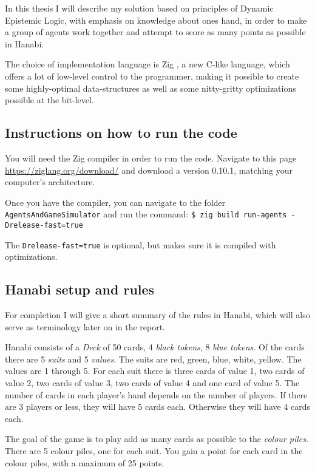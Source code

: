 In this thesis I will describe my solution based on principles of Dynamic Epistemic Logic, with emphasis on knowledge about ones hand, in order to make a group of agents work together and attempt to score as many points as possible in Hanabi. 

The choice of implementation language is Zig \cite{Ziglang}, a new C-like language, which offers a lot of low-level control to the programmer, making it possible to create some highly-optimal data-structures as well as some nitty-gritty optimizations possible at the bit-level.



\subsection{Instructions on how to run the code}
You will need the Zig compiler in order to run the code. Navigate to this page \url{https://ziglang.org/download/} and download a version 0.10.1, matching your computer's architecture.

Once you have the compiler, you can navigate to the folder {\tt AgentsAndGameSimulator} and run the command: {\tt \$ zig build run-agents -Drelease-fast=true}

The {\tt Drelease-fast=true} is optional, but makes sure it is compiled with optimizations.



\subsection{Hanabi setup and rules}
For completion I will give a short summary of the rules in Hanabi, which will also serve as terminology later on in the report.

Hanabi consists of a \emph{Deck} of 50 cards, 4 \emph{black tokens}, 8 \emph{blue tokens}.  
Of the cards there are 5 \emph{suits} and 5 \emph{values}. 
The suits are red, green, blue, white, yellow. 
The values are 1 through 5. 
For each suit there is three cards of value 1, two cards of value 2, two cards of value 3, two cards of value 4 and one card of value 5.
The number of cards in each player's hand depends on the number of players. If there are 3 players or less, they will have 5 cards each. Otherwise they will have 4 cards each.

The goal of the game is to play add as many cards as possible to the \emph{colour piles}. 
There are 5 colour piles, one for each suit. You gain a point for each card in the colour piles, with a maximum of 25 points.

